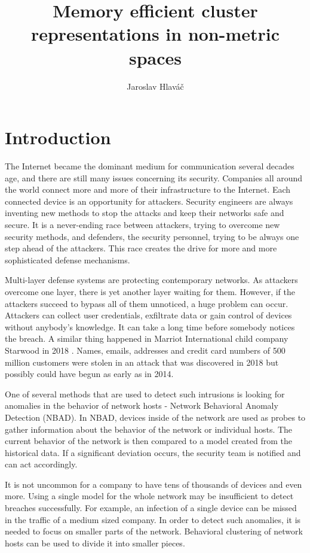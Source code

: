 \documentclass[thesis=B,english]{FITthesis}[2012/10/20]
\title{ Memory efficient cluster representations in non-metric spaces}
\author{Jaroslav Hlaváč} %
\begin{document}

\chapter{Introduction}

The Internet became the dominant medium for communication several decades age, and there are still many issues concerning its security.
Companies all around the world connect more and more of their infrastructure to the Internet.
Each connected device is an opportunity for attackers.
Security engineers are always inventing new methods to stop the attacks and keep their networks safe and secure.
It is a never-ending race between attackers, trying to overcome new security methods, and defenders, the security personnel, trying to be always one step ahead of the attackers.
This race creates the drive for more and more sophisticated defense mechanisms.

Multi-layer defense systems are protecting contemporary networks.
As attackers overcome one layer, there is yet another layer waiting for them.
However, if the attackers succeed to bypass all of them unnoticed, a huge problem can occur.
Attackers can collect user credentials,  exfiltrate data or gain control of devices without anybody's knowledge.
It can take a long time before somebody notices the breach.
A similar thing happened in Marriot International child company Starwood in 2018 \cite{hron2018breaches}.
Names, emails, addresses and credit card numbers of 500 million customers were stolen in an attack that was discovered in 2018 but possibly could have begun as early as in 2014.

One of several methods that are used to detect such intrusions is looking for anomalies in the behavior of network hosts - Network Behavioral Anomaly Detection (NBAD).
In NBAD, devices inside of the network are used as probes to gather information about the behavior of the network or individual hosts.
The current behavior of the network is then compared to a model created from the historical data.
If a significant deviation occurs, the security team is notified and can act accordingly.

It is not uncommon for a company to have tens of thousands of devices and even more.
Using a single model for the whole network may be insufficient to detect breaches successfully.
For example, an infection of a single device can be missed in the traffic of a medium sized company.
In order to detect such anomalies, it is needed to focus on smaller parts of the network.
Behavioral clustering of network hosts can be used to divide it into smaller pieces.
\end{document}
